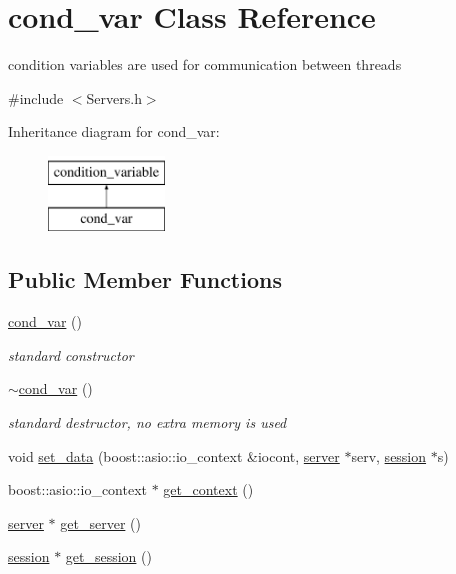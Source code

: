 \hypertarget{classcond__var}{}\section{cond\+\_\+var Class Reference}
\label{classcond__var}


condition variables are used for communication between threads  




{\ttfamily \#include $<$Servers.\+h$>$}

Inheritance diagram for cond\+\_\+var\+:\begin{figure}[H]
\begin{center}
\leavevmode
\includegraphics[height=2.000000cm]{classcond__var}
\end{center}
\end{figure}
\subsection*{Public Member Functions}
\begin{DoxyCompactItemize}
\item 
\mbox{\label{classcond__var_a93dbd1d43db5b2c64fd740c240e2418c}} 
\hyperlink{classcond__var_a93dbd1d43db5b2c64fd740c240e2418c}{cond\+\_\+var} ()
\begin{DoxyCompactList}\small\item\em standard constructor \end{DoxyCompactList}\item 
\mbox{\label{classcond__var_aeee90ce194ac52729ec961359d489bfb}} 
\hyperlink{classcond__var_aeee90ce194ac52729ec961359d489bfb}{$\sim$cond\+\_\+var} ()
\begin{DoxyCompactList}\small\item\em standard destructor, no extra memory is used \end{DoxyCompactList}\item 
void \hyperlink{classcond__var_a41eff0f79f6695bbaca67153559c4885}{set\+\_\+data} (boost\+::asio\+::io\+\_\+context \&iocont, \hyperlink{classserver}{server} $\ast$serv, \hyperlink{classsession}{session} $\ast$s)
\item 
boost\+::asio\+::io\+\_\+context $\ast$ \hyperlink{classcond__var_aa517d0951844aaa609600903635b887d}{get\+\_\+context} ()
\item 
\hyperlink{classserver}{server} $\ast$ \hyperlink{classcond__var_ae55f3716e292cca887be939fe8f10c26}{get\+\_\+server} ()
\item 
\hyperlink{classsession}{session} $\ast$ \hyperlink{classcond__var_a624ff85e7f2850661ec9c408ef1a7a26}{get\+\_\+session} ()
\end{DoxyCompactItemize}


